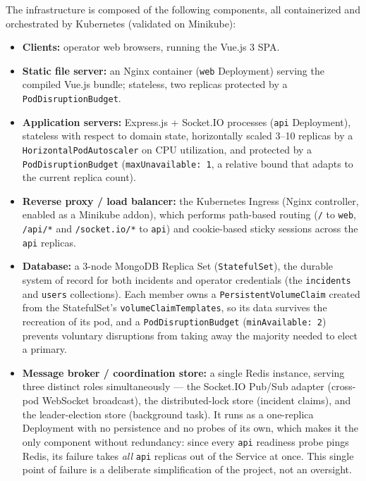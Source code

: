 \documentclass{scrartcl}
\begin{document}
The infrastructure is composed of the following components, all containerized and orchestrated by Kubernetes (validated on Minikube):
%
\begin{itemize}
  \item \textbf{Clients:} operator web browsers, running the Vue.js 3 SPA.
  \item \textbf{Static file server:} an Nginx container (\texttt{web} Deployment) serving the compiled Vue.js bundle; stateless, two replicas protected by a \texttt{PodDisruptionBudget}.
  \item \textbf{Application servers:} Express.js + Socket.IO processes (\texttt{api} Deployment), stateless with respect to domain state, horizontally scaled 3--10 replicas by a \texttt{HorizontalPodAutoscaler} on CPU utilization, and protected by a \texttt{PodDisruptionBudget} (\texttt{maxUnavailable: 1}, a relative bound that adapts to the current replica count).
  \item \textbf{Reverse proxy / load balancer:} the Kubernetes Ingress (Nginx controller, enabled as a Minikube addon), which performs path-based routing (\texttt{/} to \texttt{web}, \texttt{/api/*} and \texttt{/socket.io/*} to \texttt{api}) and cookie-based sticky sessions across the \texttt{api} replicas.
  \item \textbf{Database:} a 3-node MongoDB Replica Set (\texttt{StatefulSet}), the durable system of record for both incidents and operator credentials (the \texttt{incidents} and \texttt{users} collections). Each member owns a \texttt{PersistentVolumeClaim} created from the StatefulSet's \texttt{volumeClaimTemplates}, so its data survives the recreation of its pod, and a \texttt{PodDisruptionBudget} (\texttt{minAvailable: 2}) prevents voluntary disruptions from taking away the majority needed to elect a primary.
  \item \textbf{Message broker / coordination store:} a single Redis instance, serving three distinct roles simultaneously --- the Socket.IO Pub/Sub adapter (cross-pod WebSocket broadcast), the distributed-lock store (incident claims), and the leader-election store (background task). It runs as a one-replica Deployment with no persistence and no probes of its own, which makes it the only component without redundancy: since every \texttt{api} readiness probe pings Redis, its failure takes \emph{all} \texttt{api} replicas out of the Service at once. This single point of failure is a deliberate simplification of the project, not an oversight.
\end{itemize}
%
\end{document}
